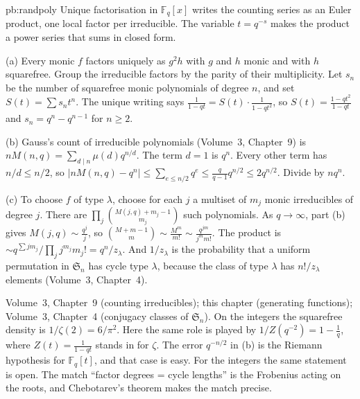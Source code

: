 \begin{solution}{pb:randpoly}
\idea Unique factorisation in $\mathbb F_q[x]$ writes the counting series as an Euler product, one local factor per irreducible. The variable $t=q^{-s}$ makes the product a power series that sums in closed form.

\writeup (a) Every monic $f$ factors uniquely as $g^2h$ with $g$ and $h$ monic and with $h$ squarefree. Group the irreducible factors by the parity of
their multiplicity. Let $s_n$ be the number of squarefree monic polynomials of degree $n$, and set $S(t)=\sum s_nt^n$. The unique writing says
$\frac1{1-qt}=S(t)\cdot\frac1{1-qt^2}$, so $S(t)=\frac{1-qt^2}{1-qt}$ and $s_n=q^n-q^{n-1}$ for $n\ge2$.

(b) Gauss's count of irreducible polynomials (Volume~3, Chapter~9) is $nM(n,q)=\sum_{d\mid n}\mu(d)q^{n/d}$. The term $d=1$ is $q^n$. Every other term has $n/d\le n/2$, so
$|nM(n,q)-q^n|\le\sum_{e\le n/2}q^e\le\frac q{q-1}q^{n/2}\le2q^{n/2}$. Divide by $nq^n$.

(c) To choose $f$ of type $\lambda$, choose for each $j$ a multiset of $m_j$ monic irreducibles of degree $j$. There are
$\prod_j\binom{M(j,q)+m_j-1}{m_j}$ such polynomials. As $q\to\infty$, part (b) gives $M(j,q)\sim\frac{q^j}j$, so
$\binom{M+m-1}m\sim\frac{M^m}{m!}\sim\frac{q^{jm}}{j^mm!}$. The product is $\sim q^{\sum jm_j}/\prod_jj^{m_j}m_j!=q^n/z_\lambda$. And
$1/z_\lambda$ is the probability that a uniform permutation in $\mathfrak S_n$ has cycle type $\lambda$, because the class of type
$\lambda$ has $n!/z_\lambda$ elements (Volume~3, Chapter~4).

\tools Volume~3, Chapter~9 (counting irreducibles); this chapter (generating functions); Volume~3, Chapter~4 (conjugacy classes of
$\mathfrak S_n$).
\leads On the integers the squarefree density is $1/\zeta(2)=6/\pi^2$. Here the same role is played by $1/Z(q^{-2})=1-\frac1q$, where
$Z(t)=\frac1{1-qt}$ stands in for $\zeta$. The error $q^{-n/2}$ in (b) is the Riemann hypothesis for $\mathbb F_q[t]$, and that case is
easy. For the integers the same statement is open. The match ``factor degrees = cycle lengths'' is the Frobenius acting on the roots,
and Chebotarev's theorem makes the match precise.
\end{solution}

